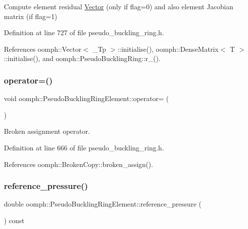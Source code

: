 Compute element residual \hyperlink{classoomph_1_1Vector}{Vector} (only if flag=0) and also element Jacobian matrix (if flag=1) 



Definition at line 727 of file pseudo\+\_\+buckling\+\_\+ring.\+h.



References oomph\+::\+Vector$<$ \+\_\+\+Tp $>$\+::initialise(), oomph\+::\+Dense\+Matrix$<$ T $>$\+::initialise(), and oomph\+::\+Pseudo\+Buckling\+Ring\+::r\+\_().

\mbox{\label{classoomph_1_1PseudoBucklingRingElement_aadfdd6b002f132ab9593948ce331c5e9}} 
\subsubsection{\texorpdfstring{operator=()}{operator=()}}
{\footnotesize\ttfamily void oomph\+::\+Pseudo\+Buckling\+Ring\+Element\+::operator= (\begin{DoxyParamCaption}\item[{const \hyperlink{classoomph_1_1PseudoBucklingRingElement}{Pseudo\+Buckling\+Ring\+Element} \&}]{ }\end{DoxyParamCaption})\hspace{0.3cm}{\ttfamily [inline]}}



Broken assignment operator. 



Definition at line 666 of file pseudo\+\_\+buckling\+\_\+ring.\+h.



References oomph\+::\+Broken\+Copy\+::broken\+\_\+assign().

\mbox{\label{classoomph_1_1PseudoBucklingRingElement_aff68b0969259a49194526660ed8a93a2}} 
\subsubsection{\texorpdfstring{reference\+\_\+pressure()}{reference\_pressure()}}
{\footnotesize\ttfamily double oomph\+::\+Pseudo\+Buckling\+Ring\+Element\+::reference\+\_\+pressure (\begin{DoxyParamCaption}{ }\end{DoxyParamCaption}) const\hspace{0.3cm}{\ttfamily [inline]}}



